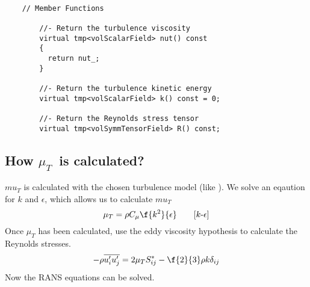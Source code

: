\begin{listing}[H]
  \renewcommand\theFancyVerbLine{%
    \ifnum\value{FancyVerbLine}=103
      \setcounter{FancyVerbLine}{107}\vdots
    \else
      \ifnum\value{FancyVerbLine}=113
        \setcounter{FancyVerbLine}{118}\vdots
      \else
        \ifnum\value{FancyVerbLine}=124
          \vdots
        \else
          \ifnum\value{FancyVerbLine}=101
            \vdots
          \else
            \color{MidGrey}\arabic{FancyVerbLine}%
          \fi
        \fi
      \fi
    \fi
  }
\begin{verbatim}

    // Member Functions

        //- Return the turbulence viscosity
        virtual tmp<volScalarField> nut() const
        {
          return nut_;
        }

        //- Return the turbulence kinetic energy
        virtual tmp<volScalarField> k() const = 0;

        //- Return the Reynolds stress tensor
        virtual tmp<volSymmTensorField> R() const;

\end{verbatim}
\caption{{\protect{}}}
\end{listing}



\subsection{How \texorpdfstring{\(\mu_T\)}\ \ is calculated?}

\(mu_T\) is calculated with the chosen turbulence model (like \keModel).
We solve an eqaution for \(k\) and \(\epsilon\), which allows us to calculate \(mu_T\)
%
\begin{equation}
  \mu_T = \rho C_{\mu} \f{k^2}{\epsilon}
  \qquad
  [k\text{-}\epsilon]
  \label{eq:mu_t-formula-k-epsilon}
\end{equation}
%
Once \(\mu_T\) has been calculated, use the eddy viscosity hypothesis to calculate the Reynolds stresses.
%
\begin{equation}
  -\rho \overline{u^\prime_i u^\prime_j} = 2 \mu_T S^*_{ij} - \f{2}{3} \rho k \delta_{ij}
\end{equation}
%
Now the RANS equations can be solved.


